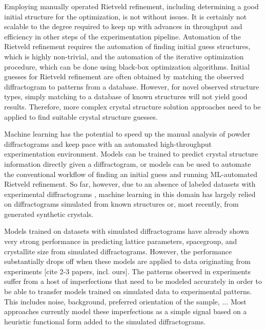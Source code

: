 Employing manually operated Rietveld refinement, including determining a good initial structure for the optimization, is not without issues.
It is certainly not scalable to the degree required to keep up with advances in throughput and efficiency in other steps of the experimentation pipeline.
Automation of the Rietveld refinement requires the automation of finding initial guess structures, which is highly non-trivial, and the automation of the iterative optimization procedure, which can be done using black-box optimization algorithms. \cite{Ozaki2020} 
Initial guesses for Rietveld refinement are often obtained by matching the observed diffractogram to patterns from a database. \cite{Belsky2002, GatesRector2019}
However, for novel observed structure types, simply matching to a database of known structures will not yield good results. Therefore, more complex crystal structure solution approaches need to be applied to find suitable crystal structure guesses.

Machine learning has the potential to speed up the manual analysis of powder diffractograms and keep pace with an automated high-throughput experimentation environment. \cite{Agrawal2019, Surdu2023}
Models can be trained to predict crystal structure information directly given a diffractogram, or models can be used to automate the conventional workflow of finding an initial guess and running ML-automated Rietveld refinement. \cite{Surdu2023,Feng2019} 
So far, however, due to an absence of labeled datasets with experimental diffractograms\cite{Wang2020} , machine learning in this domain has largely relied on diffractograms simulated from known structures\cite{Park2017} \cite{Lee2023} or, most recently, from generated synthetic crystals. \cite{Schopmans2023}

Models trained on datasets with simulated diffractograms have already shown very strong performance in predicting
lattice parameters, spacegroup, and crystallite size from simulated diffractograms.
However, the performance substantially drops off when these models are applied to data originating from experiments [cite 2-3 papers, incl. ours].
The patterns observed in experiments suffer from a host of imperfections that need to be modeled accurately in order to be able to transfer models trained on simulated data to experimental patterns. This includes noise, background, preferred orientation of the sample, ...
Most approaches currently model these imperfections as a simple signal based on a heuristic functional form added to the simulated diffractograms.

